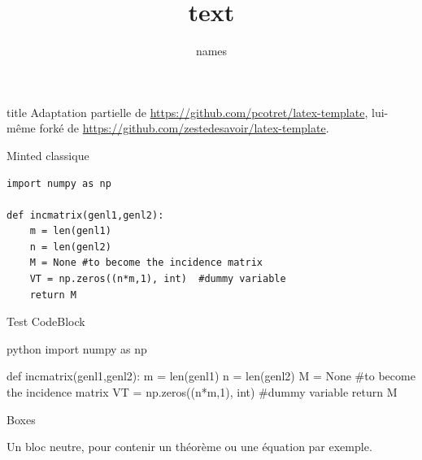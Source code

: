\documentclass{beamer}
\author{names}
\title{text}
\begin{document}
\frame[plain]{\titlepage} 

\begin{frame}{title}
Adaptation partielle de \url{https://github.com/pcotret/latex-template}, lui-même forké de \url{https://github.com/zestedesavoir/latex-template}.
\end{frame}

	\begin{frame}[fragile]{Minted classique}
\begin{verbatim}
import numpy as np
	
def incmatrix(genl1,genl2):
	m = len(genl1)
	n = len(genl2)
	M = None #to become the incidence matrix
	VT = np.zeros((n*m,1), int)  #dummy variable
	return M
\end{verbatim}
	\end{frame}
\begin{frame}[fragile]{Test CodeBlock}

\begin{CodeBlock}{python}
import numpy as np

def incmatrix(genl1,genl2):
	m = len(genl1)
	n = len(genl2)
	M = None #to become the incidence matrix
	VT = np.zeros((n*m,1), int)  #dummy variable
	return M
\end{CodeBlock}
\end{frame}

\begin{frame}[allowframebreaks]{Boxes}
	\begin{Information}
		\blindtext
	\end{Information}
	
	\begin{Question}
		\blindtext
	\end{Question}
	
	\begin{Warning}
		\blindtext
	\end{Warning}
	
	\begin{Error}
		\blindtext
	\end{Error}
	
	\begin{Information}
		\blindtext
	\end{Information}
	
	\begin{Neutral}
		Un bloc neutre, pour contenir un théorème ou une équation par exemple.
	\end{Neutral}
\end{frame}
\end{document}
